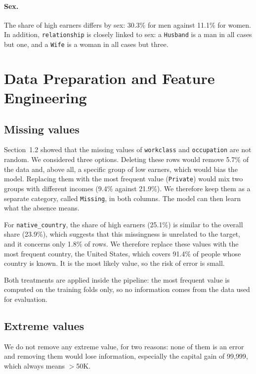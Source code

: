 \documentclass[10pt,a4paper]{article}
\newcommand{\high}{$>$50K}
\begin{document}
\paragraph{Sex.}
The share of high earners differs by sex: 30.3\% for men against 11.1\% for women. In
addition, \texttt{relationship} is closely linked to sex: a \texttt{Husband} is a man in
all cases but one, and a \texttt{Wife} is a woman in all cases but three.

\section{Data Preparation and Feature Engineering}

\subsection{Missing values}
Section~1.2 showed that the missing values of \texttt{workclass} and \texttt{occupation}
are not random. We considered three options. Deleting these rows would remove 5.7\% of
the data and, above all, a specific group of low earners, which would bias the model.
Replacing them with the most frequent value (\texttt{Private}) would mix two groups with
different incomes (9.4\% against 21.9\%). We therefore keep them as a separate category,
called \texttt{Missing}, in both columns. The model can then learn what the absence means.

For \texttt{native\_country}, the share of high earners (25.1\%) is similar to the overall share (23.9\%), 
which suggests that this missingness is unrelated to the target, and it concerns only 1.8\% of rows. 
We therefore replace these values with the most frequent country, the United States,
which covers 91.4\% of people whose country is known. It is the most likely value, so the
risk of error is small. 

Both treatments are applied inside the pipeline: the most
frequent value is computed on the training folds only, so no information comes from the
data used for evaluation.

\subsection{Extreme values}
We do not remove any extreme value, for two reasons: none of them is an error and
removing them would lose information, especially the capital gain of 99{,}999, which
always means \high{}.
\end{document}
